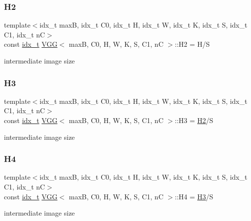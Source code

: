 \subsubsection{\texorpdfstring{H2}{H2}}
{\footnotesize\ttfamily template$<$idx\+\_\+t maxB, idx\+\_\+t C0, idx\+\_\+t H, idx\+\_\+t W, idx\+\_\+t K, idx\+\_\+t S, idx\+\_\+t C1, idx\+\_\+t nC$>$ \\
const \hyperlink{vgg__util_8h_a8e93478a00e685bea5e6a3f617bf03a3}{idx\+\_\+t} \hyperlink{structVGG}{V\+GG}$<$ maxB, C0, H, W, K, S, C1, nC $>$\+::H2 = H/S\hspace{0.3cm}{\ttfamily [static]}}

intermediate image size \mbox{\label{structVGG_aad221438514d3b1a829d7f9c27a6f5ea}} 
\subsubsection{\texorpdfstring{H3}{H3}}
{\footnotesize\ttfamily template$<$idx\+\_\+t maxB, idx\+\_\+t C0, idx\+\_\+t H, idx\+\_\+t W, idx\+\_\+t K, idx\+\_\+t S, idx\+\_\+t C1, idx\+\_\+t nC$>$ \\
const \hyperlink{vgg__util_8h_a8e93478a00e685bea5e6a3f617bf03a3}{idx\+\_\+t} \hyperlink{structVGG}{V\+GG}$<$ maxB, C0, H, W, K, S, C1, nC $>$\+::H3 = \hyperlink{structVGG_a6658da7d5fd275b2af6eb75511ba6f80}{H2}/S\hspace{0.3cm}{\ttfamily [static]}}

intermediate image size \mbox{\label{structVGG_a1754afced5b0bbb91031179c1f58ee29}} 
\subsubsection{\texorpdfstring{H4}{H4}}
{\footnotesize\ttfamily template$<$idx\+\_\+t maxB, idx\+\_\+t C0, idx\+\_\+t H, idx\+\_\+t W, idx\+\_\+t K, idx\+\_\+t S, idx\+\_\+t C1, idx\+\_\+t nC$>$ \\
const \hyperlink{vgg__util_8h_a8e93478a00e685bea5e6a3f617bf03a3}{idx\+\_\+t} \hyperlink{structVGG}{V\+GG}$<$ maxB, C0, H, W, K, S, C1, nC $>$\+::H4 = \hyperlink{structVGG_aad221438514d3b1a829d7f9c27a6f5ea}{H3}/S\hspace{0.3cm}{\ttfamily [static]}}

intermediate image size \mbox{\label{structVGG_a763d01cce59fd355cbcfb7b09c3c8cdc}} 
